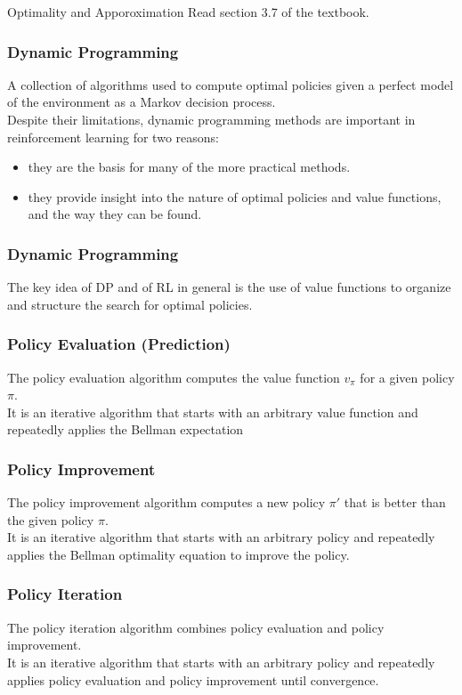 \documentclass[12pt]{beamer}
\newcommand{\nl}{\vspace*{1em}\\}
\begin{document}
\begin{frame}{Optimality and Apporoximation}
    \Large{Read section 3.7 of the textbook.}\nl
\end{frame}


\begin{frame}\frametitle{Dynamic Programming}
    A collection of algorithms used to compute optimal policies given
    a perfect model of the environment as a Markov decision process.\nl

    Despite their limitations, dynamic programming methods are important in
    reinforcement learning for two reasons:
    \begin{itemize}
        \item they are the basis for many of the more practical methods.
        \item they provide insight into the nature of optimal policies and value functions,
                and the way they can be found.
    \end{itemize}
\end{frame}

\begin{frame}\frametitle{Dynamic Programming}
    The key idea of DP and of RL in general is the use of value functions to
    organize and structure the search for optimal policies.\nl
\end{frame}

\begin{frame}\frametitle{Policy Evaluation (Prediction)}
    The policy evaluation algorithm computes the value function $v_\pi$ for a given policy $\pi$.\nl

    It is an iterative algorithm that starts with an arbitrary value function
    and repeatedly applies the Bellman expectation
\end{frame}

\begin{frame}\frametitle{Policy Improvement}
    The policy improvement algorithm computes a new policy $\pi'$ that is better
    than the given policy $\pi$.\nl

    It is an iterative algorithm that starts with an arbitrary policy and
    repeatedly applies the Bellman optimality equation to improve the policy.
\end{frame}

\begin{frame}\frametitle{Policy Iteration}
    The policy iteration algorithm combines policy evaluation and policy improvement.\nl
    It is an iterative algorithm that starts with an arbitrary policy
    and repeatedly applies policy evaluation and policy improvement until convergence.
\end{frame}
\end{document}
